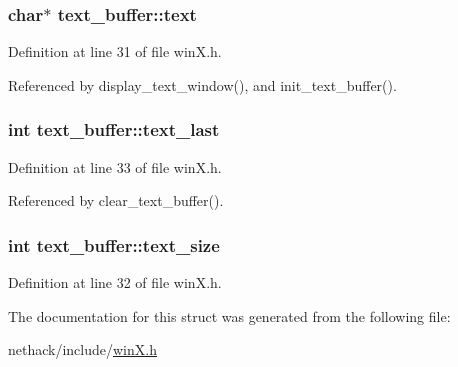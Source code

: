 \hypertarget{structtext__buffer_addf46d0312deaf1c33baacc8fd147acb}{
\subsubsection[{text}]{\setlength{\rightskip}{0pt plus 5cm}char$\ast$ text\+\_\+buffer\+::text}}\label{structtext__buffer_addf46d0312deaf1c33baacc8fd147acb}


Definition at line 31 of file win\+X.\+h.



Referenced by display\+\_\+text\+\_\+window(), and init\+\_\+text\+\_\+buffer().

\hypertarget{structtext__buffer_ae35a9a063efe6fe0686ddd0243422219}{
\subsubsection[{text\+\_\+last}]{\setlength{\rightskip}{0pt plus 5cm}int text\+\_\+buffer\+::text\+\_\+last}}\label{structtext__buffer_ae35a9a063efe6fe0686ddd0243422219}


Definition at line 33 of file win\+X.\+h.



Referenced by clear\+\_\+text\+\_\+buffer().

\hypertarget{structtext__buffer_ac664b06fbe050d6bf4058fdcd42e6076}{
\subsubsection[{text\+\_\+size}]{\setlength{\rightskip}{0pt plus 5cm}int text\+\_\+buffer\+::text\+\_\+size}}\label{structtext__buffer_ac664b06fbe050d6bf4058fdcd42e6076}


Definition at line 32 of file win\+X.\+h.



The documentation for this struct was generated from the following file\+:\begin{DoxyCompactItemize}
\item 
nethack/include/\hyperlink{winX_8h}{win\+X.\+h}\end{DoxyCompactItemize}
